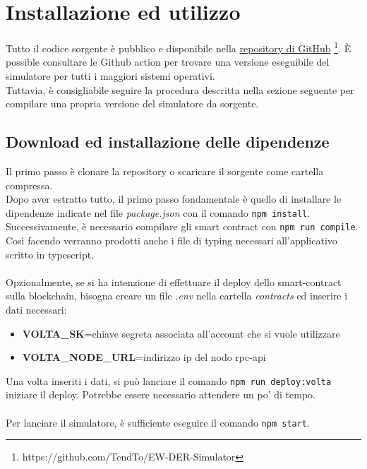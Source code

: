 \chapter{Installazione ed utilizzo}

Tutto il codice sorgente è pubblico e disponibile nella \href{https://github.com/TendTo/EW-DER-Simulator}{repository di GitHub} \footnote{https://github.com/TendTo/EW-DER-Simulator}.
È possible consultare le Github action per trovare una versione eseguibile del simulatore per tutti i maggiori sistemi operativi. \\
Tuttavia, è consigliabile seguire la procedura descritta nella sezione seguente per compilare una propria versione del simulatore da sorgente.

\section{Download ed installazione delle dipendenze}

Il primo passo è clonare la repository o scaricare il sorgente come cartella compressa. \\
Dopo aver estratto tutto, il primo passo fondamentale è quello di installare le dipendenze indicate nel file \textit{package.json} con il comando \texttt{npm install}.
Successivamente, è necessario compilare gli smart contract con \texttt{npm run compile}. \\
Così facendo verranno prodotti anche i file di typing necessari all'applicativo scritto in typescript. \\
\\
Opzionalmente, se si ha intenzione di effettuare il deploy dello \gls{smart-contract} sulla \gls{blockchain},
bisogna creare un file \textit{.env} nella cartella \textit{contracts} ed inserire i dati necessari:
\begin{itemize}
    \item \textbf{VOLTA\_SK}=chiave segreta associata all'account che si vuole utilizzare
    \item \textbf{VOLTA\_NODE\_URL}=indirizzo ip del nodo \gls{rpc-api}
\end{itemize}
Una volta inseriti i dati, si può lanciare il comando \texttt{npm run deploy:volta} iniziare il deploy.
Potrebbe essere necessario attendere un po' di tempo. \\
\\
Per lanciare il simulatore, è sufficiente eseguire il comando \texttt{npm start}.

